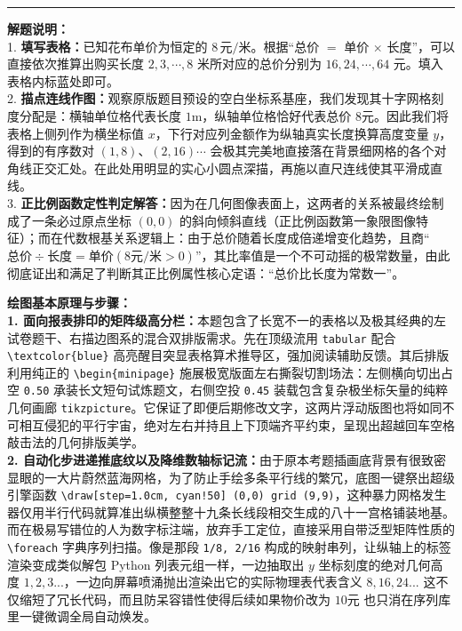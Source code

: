 \documentclass[12pt, a4paper]{ctexrep}
\begin{document}
\vspace{0.8cm}
\hrule
\vspace{0.4cm}

{\small\color{gray}
\textbf{解题说明：}\\
1. \textbf{填写表格：}已知花布单价为恒定的 $8\,\text{元/米}$。根据“总价 $=$ 单价 $\times$ 长度”，可以直接依次推算出购买长度 $2, 3, \cdots, 8$ 米所对应的总价分别为 $16, 24, \cdots, 64$ 元。填入表格内标蓝处即可。\\
2. \textbf{描点连线作图：}观察原版题目预设的空白坐标系基座，我们发现其十字网格刻度分配是：横轴单位格代表长度 $1\text{m}$，纵轴单位格恰好代表总价 $8\text{元}$。因此我们将表格上侧列作为横坐标值 $x$，下行对应列金额作为纵轴真实长度换算高度变量 $y$，得到的有序数对 $(1,8)、(2,16) \cdots$ 会极其完美地直接落在背景细网格的各个对角线正交汇处。在此处用明显的实心小圆点深描，再施以直尺连线使其平滑成直线。\\
3. \textbf{正比例函数定性判定解答：}因为在几何图像表面上，这两者的关系被最终绘制成了一条必过原点坐标 $(0,0)$ 的斜向倾斜直线（正比例函数第一象限图像特征）；而在代数根基关系逻辑上：由于总价随着长度成倍递增变化趋势，且商“$\text{总价} \div \text{长度} = \text{单价}(8\text{元/米} > 0)$”，其比率值是一个不可动摇的极常数量，由此彻底证出和满足了判断其正比例属性核心定语：“总价比长度为常数一”。
}

\vspace{0.6cm}

{\small\color{blue!70!black}
\textbf{绘图基本原理与步骤：}\\
\textbf{1. 面向报表排印的矩阵级高分栏：}本题包含了长宽不一的表格以及极其经典的左试卷题干、右描边图系的混合双排版需求。先在顶级流用 \texttt{tabular} 配合 \texttt{\textbackslash textcolor\{blue\}} 高亮醒目突显表格算术推导区，强加阅读辅助反馈。其后排版利用纯正的 \texttt{\textbackslash begin\{minipage\}} 施展极宽版面左右撕裂切割场法：左侧横向切出占空 \texttt{0.50} 承装长文短句试炼题文，右侧空投 \texttt{0.45} 装载包含复杂极坐标矢量的纯粹几何画廊 \texttt{tikzpicture}。它保证了即便后期修改文字，这两片浮动版图也将如同不可相互侵犯的平行宇宙，绝对左右并持且上下顶端齐平约束，呈现出超越回车空格敲击法的几何排版美学。\\
\textbf{2. 自动化步进递推底纹以及降维数轴标记流：}由于原本考题插画底背景有很致密显眼的一大片蔚然蓝海网格，为了防止手绘多条平行线的繁冗，底图一键祭出超级引擎函数 \texttt{\textbackslash draw[step=1.0cm, cyan!50] (0,0) grid (9,9)}，这种暴力网格发生器仅用半行代码就算准出纵横整整十九条长线段相交生成的八十一宫格铺装地基。而在极易写错位的人为数字标注端，放弃手工定位，直接采用自带泛型矩阵性质的 \texttt{\textbackslash foreach} 字典序列扫描。像是那段 \texttt{1/8, 2/16} 构成的映射串列，让纵轴上的标签渲染变成类似解包 Python 列表元组一样，一边抽取出 $y$ 坐标刻度的绝对几何高度 $1,2,3...$，一边向屏幕喷涌抛出渲染出它的实际物理表代表含义 $8,16,24...$ 这不仅缩短了冗长代码，而且防呆容错性使得后续如果物价改为 $10\text{元}$ 也只消在序列库里一键微调全局自动焕发。
}
\end{document}
